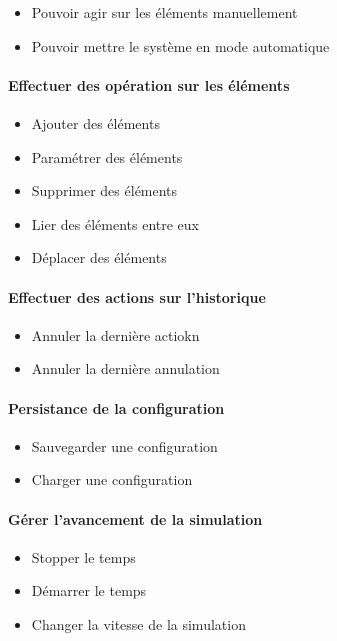 {
\begin{itemize}
	\item Pouvoir agir sur les éléments manuellement
	\item Pouvoir mettre le système en mode automatique
\end{itemize}}
{
\paragraph{Effectuer des opération sur les éléments }
\begin{itemize}
	\item Ajouter des éléments
	\item Paramétrer des éléments
	\item Supprimer des éléments
	\item Lier des éléments entre eux
	\item Déplacer des éléments
\end{itemize}

\paragraph{Effectuer des actions sur l'historique}
\begin{itemize}
	\item Annuler la dernière actiokn
	\item Annuler la dernière annulation
\end{itemize}

\paragraph{Persistance de la configuration}
\begin{itemize}
	\item Sauvegarder une configuration
	\item Charger une configuration
\end{itemize}

\paragraph{Gérer l'avancement de la simulation}
\begin{itemize}
	\item Stopper le temps
	\item Démarrer le temps
	\item Changer la vitesse de la simulation
\end{itemize}

}
